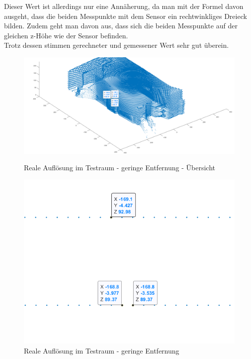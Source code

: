 Dieser Wert ist allerdings nur eine Annäherung, da man mit der Formel davon ausgeht, dass die beiden Messpunkte mit dem Sensor ein rechtwinkliges Dreieck bilden. Zudem geht man davon aus, dass sich die beiden Messpunkte auf der gleichen z-Höhe wie der Sensor befinden.\\
Trotz dessen stimmen gerechneter und gemessener Wert sehr gut überein.   
\begin{figure}[H]
	\centering
	\begin{minipage}[t]{0.45\linewidth}
		\centering
		\includegraphics[width=1.2\linewidth]{images/Validierung/Aufloesungen/3Messwerte_Ansicht.png}
		\caption{Reale Auflösung im Testraum - geringe Entfernung - Übersicht}
		\label{realeAuslösung1_Übersicht}
	\end{minipage}
	\hfill
	\begin{minipage}[t]{0.45\linewidth}
		\centering
		\includegraphics[width=1.2\linewidth]{images/Validierung/Aufloesungen/3Label.png}
		\caption{Reale Auflösung im Testraum - geringe Entfernung}
		\label{realeAuslösung1}
	\end{minipage}
\end{figure}




